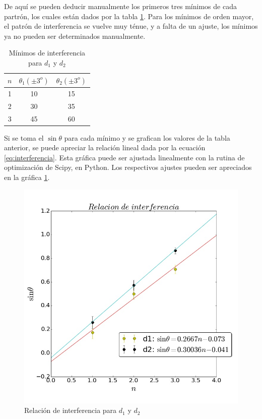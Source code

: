 \documentclass[%
 reprint,
 amsmath,amssymb,
 aps,
]{revtex4-1}
\begin{document}
De aquí se pueden deducir manualmente los primeros  tres mínimos de cada partrón, los cuales están dados por la tabla \ref{table:minimos}. Para los mínimos de orden mayor, el patrón de interferencia se vuelve muy ténue, y a falta de un ajuste, los mínimos ya no pueden ser determinados manualmente.\\


\begin{table}[h!]
\centering
\begin{tabular}{|c|c|c|}
	\hline $n $ & $ \theta_1 (\pm 3^o) $ & $ \theta_2 (\pm 3^o) $ \\ 
	\hline\hline
	1 & 10 & 15 \\
	2 & 30 & 35 \\
	3 & 45 & 60 \\
	[1ex] 
 \hline
 \end{tabular} 
  \caption{Mínimos de interferencia para $d_1$ y $d_2$}
\label{table:minimos} 
\end{table}

Si se toma el $\sin{\theta}$ para cada mínimo y se grafican los valores de la tabla anterior, se puede apreciar la relación lineal dada por la ecuación \ref{eq:interferencia}. Esta gráfica puede ser ajustada linealmente con la rutina de optimización de Scipy, en Python. Los respectivos ajustes pueden ser apreciados en  la gráfica \ref{fig:inter3}.\\

\begin{figure}[h!]
\centering
\includegraphics[width=0.8\linewidth]{inter3}
\caption{Relación de interferencia para $d_1$ y $d_2$}
\label{fig:inter3}
\end{figure}
\end{document}
